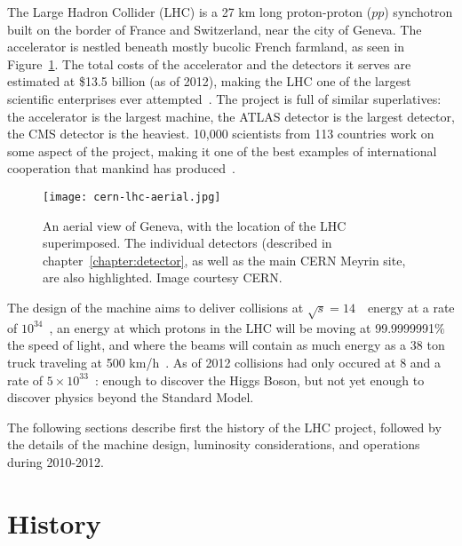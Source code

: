 \label{chapter:lhc}

The Large Hadron Collider (LHC) is a 27 km long proton-proton ($pp$) synchotron built on the border of France and Switzerland, near the city of Geneva. The accelerator is nestled beneath mostly bucolic French farmland, as seen in Figure~\ref{fig:lhc:cern-lhc-aerial}. The total costs of the accelerator and the detectors it serves are estimated at \$13.5 billion (as of 2012), making the LHC one of the largest scientific enterprises ever attempted~\cite{LHCGuide,ForbesLHC}. The project is full of similar superlatives: the accelerator is the largest machine, the ATLAS detector is the largest detector, the CMS detector is the heaviest. 10,000 scientists from 113 countries work on some aspect of the project, making it one of the best examples of international cooperation that mankind has produced~\cite{LHCGuide}.


\begin{figure}
\centering
\texttt{[image: cern-lhc-aerial.jpg]}
\label{fig:lhc:cern-lhc-aerial}
\caption{An aerial view of Geneva, with the location of the LHC superimposed. The individual detectors (described in chapter~\ref{chapter:detector}, as well as the main CERN Meyrin site, are also highlighted. Image courtesy CERN.}
\end{figure}


The design of the machine aims to deliver collisions at $\sqrt{s} = 14$~\TeV~energy at a rate of $10^{34}$~\lumirate, an energy at which protons in the LHC will be moving at 99.9999991$\%$ the speed of light, and where the beams will contain as much energy as a 38 ton truck traveling at 500 km/h~\cite{LHCGuide}. As of 2012 collisions had only occured at 8 \TeV and a rate of $5\times10^{33}$~\lumirate: enough to discover the Higgs Boson, but not yet enough to discover physics beyond the Standard Model.

The following sections describe first the history of the LHC project, followed by the details of the machine design, luminosity considerations, and operations during 2010-2012.

\section{History}
\label{lhc:history}

